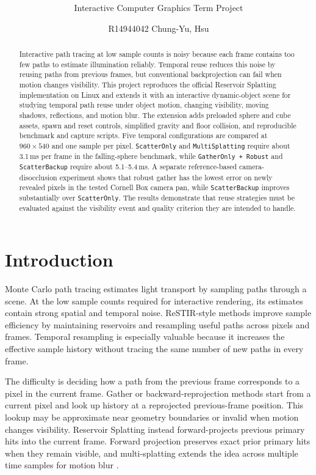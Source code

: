 \documentclass[10pt,twocolumn]{article}
\title{\vspace{-1.4em}\textbf{\projecttitle}}
\author{Interactive Computer Graphics Term Project}
\date{R14944042 Chung-Yu, Hsu}
\newcommand{\method}[1]{\texttt{#1}}
\begin{document}
\maketitle
\vspace{-1.5em}

\begin{abstract}
Interactive path tracing at low sample counts is noisy because each frame
contains too few paths to estimate illumination reliably. Temporal reuse
reduces this noise by reusing paths from previous frames, but conventional
backprojection can fail when motion changes visibility. This project
reproduces the official Reservoir Splatting implementation on Linux and
extends it with an interactive dynamic-object scene for studying temporal path
reuse under object motion, changing visibility, moving shadows, reflections,
and motion blur. The extension adds preloaded sphere and cube assets, spawn
and reset controls, simplified gravity and floor collision, and reproducible
benchmark and capture scripts. Five temporal configurations are compared at
$960{\times}540$ and one sample per pixel. \method{ScatterOnly} and
\method{MultiSplatting} require about 3.1\,ms per frame in the falling-sphere
benchmark, while \method{GatherOnly + Robust} and \method{ScatterBackup}
require about 5.1--5.4\,ms. A separate reference-based camera-disocclusion
experiment shows that robust gather has the lowest error on newly revealed
pixels in the tested Cornell Box camera pan, while \method{ScatterBackup}
improves substantially over \method{ScatterOnly}. The results demonstrate
that reuse strategies must be evaluated against the visibility event and
quality criterion they are intended to handle.
\end{abstract}

\section{Introduction}

Monte Carlo path tracing estimates light transport by sampling paths through a
scene. At the low sample counts required for interactive rendering, its
estimates contain strong spatial and temporal noise. ReSTIR-style methods
improve sample efficiency by maintaining reservoirs and resampling useful
paths across pixels and frames. Temporal resampling is especially valuable
because it increases the effective sample history without tracing the same
number of new paths in every frame.

The difficulty is deciding how a path from the previous frame corresponds to a
pixel in the current frame. Gather or backward-reprojection methods start from
a current pixel and look up history at a reprojected previous-frame position.
This lookup may be approximate near geometry boundaries or invalid when motion
changes visibility. Reservoir Splatting instead forward-projects previous
primary hits into the current frame. Forward projection preserves exact prior
primary hits when they remain visible, and multi-splatting extends the idea
across multiple time samples for motion blur \cite{reservoir-splatting}.
\end{document}
